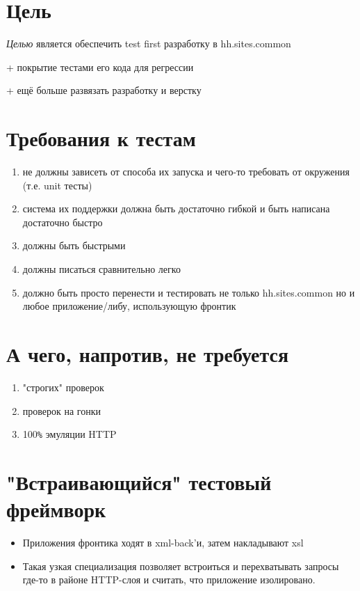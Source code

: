\documentclass[12pt]{article}
\begin{document}
\TitleSlide

\section{Цель}

\emph{Целью} является обеспечить test first разработку в hh.sites.common

+ покрытие тестами его кода для регрессии

+ ещё больше развязать разработку и верстку


\section{Требования к тестам}

\begin{enumerate}
\item не должны зависеть от способа их запуска и чего-то требовать от окружения (т.е. unit тесты)
\item система их поддержки должна быть достаточно гибкой и быть написана достаточно быстро
\item должны быть быстрыми
\item должны писаться сравнительно легко
\item должно быть просто перенести и тестировать не только hh.sites.common но и любое приложение/либу, использующую фронтик
\end{enumerate}

\section{А чего, напротив, не требуется}

\begin{enumerate}
\item "строгих" проверок
\item проверок на гонки
\item 100\verb+%+ эмуляции HTTP
\end{enumerate}

\section{"Встраивающийся" тестовый фреймворк}
\begin{itemize}
\item Приложения фронтика ходят в xml-back'и, затем накладывают xsl
\item Такая узкая специализация позволяет встроиться и перехватывать запросы где-то в районе HTTP-слоя и считать, что приложение изолировано.
\end{itemize}
\end{document}
